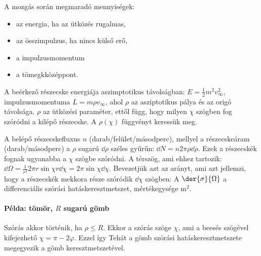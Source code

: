    A mozgás során megmaradó mennyiségek:
   \begin{itemize}
    \item az energia, ha az ütközés rugalmas,
    \item az összimpulzus, ha nincs külső erő,
    \item a impulzusmomentum
    \item a tömegkközéppont.
   \end{itemize}
   
   A beérkező részecske energiája aszimptotikus távolságban: $E=\frac{1}{2}m^2 v_\infty^2$, impulzusmomentuma $L=m\rho v_\infty$, ahol $\rho$ az asziptotikus pálya és az origó távolsága. $\rho$ az ütközési paraméter, ettől függ, hogy milyen $\chi$ szögben fog szóródni a kilépő részecske.
   A $\rho(\chi)$ függvényt keressük meg. 
   
   A belépő részecskefluxus $n$ (darab/felület/másodperc), mellyel a részecskeáram (da\-rab/má\-sod\-perc) a $\rho$ sugarú $\dd\rho$ széles gyűrűn: $\dd N=n2\pi\rho\dd\rho$.
   Ezek a részecskék fognak ugyanabba a $\chi$ szögbe szóródni.
   A térszög, ami ehhez tartozik: $\dd\Omega=\frac{1}{r^2}2\pi r\sin\chi r\dd\chi=2\pi\sin\chi\dd\chi$.
   Bevezetjük azt az arányt, ami azt jellemzi, hogy a részecskék mekkora része szóródik $\dd\chi$ szögben:
   A $\der{\sigma}{\Omega}$ a differenciális szórási hatáskeresztmetszet, mértékegysége $\mathrm{m}^2$. 
   
   \paragraph{Példa: tömör, $R$ sugarú gömb}
    
    Szórás akkor történik, ha $\rho\leq R$.
   Ekkor a szórás szöge $\chi$, ami a beesés szögével kifejezhető $\chi=\pi-2\varphi$. 
    Ezzel
    így
    Tehát a gömb szórási hatáskeresztmetszete megegyezik a gömb keresztmetszetével.
    
